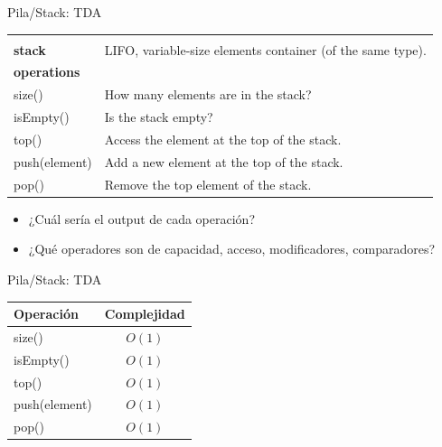 \documentclass{beamer} %
\begin{document}
\begin{frame}{Pila/Stack: TDA}
    \scriptsize{
    \begin{tabular}{lp{60ex}}\hline\\[-1ex]
      {\bf\normalsize stack} & LIFO, variable-size elements container (of the same type).\\[1.5ex]
      {\bf\small operations}  & \\
      size()            & How many elements are in the stack?\\
      isEmpty()         & Is the stack empty?\\
      top()             & Access the element at the top of the stack.\\
      push(element)     & Add a new element at the top of the stack.\\
      pop()             & Remove the top element of the stack.\\[1.5ex]\hline
    \end{tabular}

    \begin{itemize}
        \item<2-> ¿Cuál sería el output de cada operación?
        \item<2-> ¿Qué operadores son de capacidad, acceso, modificadores, comparadores?
    \end{itemize}}
\end{frame}

\begin{frame}{Pila/Stack: TDA}
    \scriptsize{
    \begin{center}
    \begin{tabular}{lc}\hline
      {\bf Operación}   & {\bf Complejidad}\\\hline
      size()            & $O(1)$\\
      isEmpty()         & $O(1)$\\
      top()             & $O(1)$\\
      push(element)     & $O(1)$\\
      pop()             & $O(1)$\\[1.5ex]\hline
    \end{tabular}
    \end{center}}
\end{frame}
\end{document}
